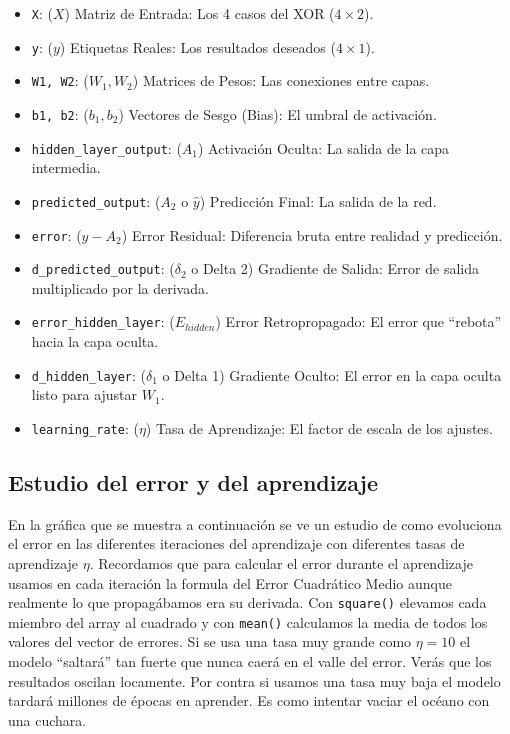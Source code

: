 \documentclass[a4paper,11pt]{article}
\begin{document}
\begin{itemize}
\item
  \texttt{X}: (\(X\)) Matriz de Entrada: Los 4 casos del XOR
  (\(4 \times 2\)).
\item
  \texttt{y}: (\(y\)) Etiquetas Reales: Los resultados deseados
  (\(4 \times 1\)).
\item
  \texttt{W1,\ W2}: (\(W_1, W_2\)) Matrices de Pesos: Las conexiones
  entre capas.
\item
  \texttt{b1,\ b2}: (\(b_1, b_2\)) Vectores de Sesgo (Bias): El umbral de
  activación.
\item
  \texttt{hidden\_layer\_output}: (\(A_1\)) Activación Oculta: La salida
  de la capa intermedia.
\item
  \texttt{predicted\_output}: (\(A_2\) o \(\hat{y}\)) Predicción Final:
  La salida de la red.
\item
  \texttt{error}: (\(y - A_2\)) Error Residual: Diferencia bruta entre
  realidad y predicción.
\item
  \texttt{d\_predicted\_output}: (\(\delta_2\) o Delta 2) Gradiente de
  Salida: Error de salida multiplicado por la derivada.
\item
  \texttt{error\_hidden\_layer}: (\(E_{hidden}\)) Error Retropropagado:
  El error que ``rebota'' hacia la capa oculta.
\item
  \texttt{d\_hidden\_layer}: (\(\delta_1\) o Delta 1) Gradiente Oculto:
  El error en la capa oculta listo para ajustar \(W_1\).
\item
  \texttt{learning\_rate}: (\(\eta\)) Tasa de Aprendizaje: El factor de
  escala de los ajustes.
\end{itemize}


\subsection{Estudio del error y del aprendizaje}

En la gráfica que se muestra a continuación se ve un estudio de como
evoluciona el error en las diferentes iteraciones del aprendizaje con
diferentes tasas de aprendizaje \(\eta\). Recordamos que para calcular
el error durante el aprendizaje usamos en cada iteración la formula del
Error Cuadrático Medio aunque realmente lo que propagábamos era su
derivada. Con \texttt{square()} elevamos cada miembro del array al
cuadrado y con \texttt{mean()} calculamos la media de todos los valores
del vector de errores. Si se usa una tasa muy grande como \(\eta = 10\)
el modelo ``saltará'' tan fuerte que nunca caerá en el valle del error.
Verás que los resultados oscilan locamente. Por contra si usamos una
tasa muy baja el modelo tardará millones de épocas en aprender. Es como
intentar vaciar el océano con una cuchara.
\end{document}
